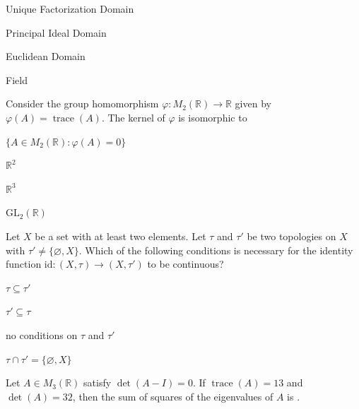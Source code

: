 \documentclass[journal,12pt,onecolumn]{IEEEtran}
\theoremstyle{remark}
\begin{document}
\begin{enumerate}
{\hfill{}

\begin{enumerate}
\begin{multicols}{2}
\item Unique Factorization Domain
\item Principal Ideal Domain
\item Euclidean Domain
\item Field
\end{multicols}
\end{enumerate}

\item Consider the group homomorphism $\varphi:M_{2}(\mathbb{R})\to\mathbb{R}$ given by
$\varphi(A)=\operatorname{trace}(A)$. The kernel of $\varphi$ is isomorphic to

\hfill{}

\begin{enumerate}
\begin{multicols}{2}
\item $\{A\in M_{2}(\mathbb{R}) : \varphi(A)=0\}$
\item $\mathbb{R}^{2}$
\item $\mathbb{R}^{3}$
\item $\mathrm{GL}_{2}(\mathbb{R})$
\end{multicols}
\end{enumerate}

\item  Let $X$ be a set with at least two elements. Let $\tau$ and $\tau'$ be two
topologies on $X$ with $\tau'\ne\{\varnothing,X\}$. Which of the following
conditions is necessary for the identity function
$\mathrm{id}:(X,\tau)\to (X,\tau')$ to be continuous?


\begin{enumerate}
\begin{multicols}{2}
\item $\tau\subseteq\tau'$
\item $\tau'\subseteq\tau$
\item no conditions on $\tau$ and $\tau'$
\item $\tau\cap\tau'=\{\varnothing,X\}$
\end{multicols}
\end{enumerate}

\item Let $A\in M_{3}(\mathbb{R})$ satisfy $\det(A-I)=0$. If $\operatorname{trace}(A)=13$ and
$\det(A)=32$, then the sum of squares of the eigenvalues of $A$ is
\underline{\hspace{2.5cm}}.

}
\end{enumerate}
\end{document}
